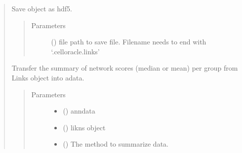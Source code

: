 \documentclass[letterpaper,10pt,english]{sphinxmanual}
\begin{document}
\begin{quote}
\begin{fulllineitems}

\begin{fulllineitems}
\label{\detokenize{modules/celloracle.network_analysis:celloracle.network_analysis.Links.to_hdf5}}
Save object as hdf5.
\begin{quote}\begin{description}
\item[{Parameters}] \leavevmode
{} () \textendash{} file path to save file. Filename needs to end with ‘.celloracle.links’

\end{description}\end{quote}

\end{fulllineitems}


\end{fulllineitems}


\begin{fulllineitems}
\label{\detokenize{modules/celloracle.network_analysis:celloracle.network_analysis.transfer_scores_from_links_to_adata}}
Transfer the summary of network scores (median or mean) per group from Links object into adata.
\begin{quote}\begin{description}
\item[{Parameters}] \leavevmode\begin{itemize}
\item {} 
 () \textendash{} anndata

\item {} 
 ({\hyperref[\detokenize{modules/celloracle:celloracle.Links}]{}}) \textendash{} likns object

\item {} 
 () \textendash{} The method to summarize data.


\end{itemize}
\end{description}
\end{quote}
\end{fulllineitems}
\end{quote}
\end{document}
